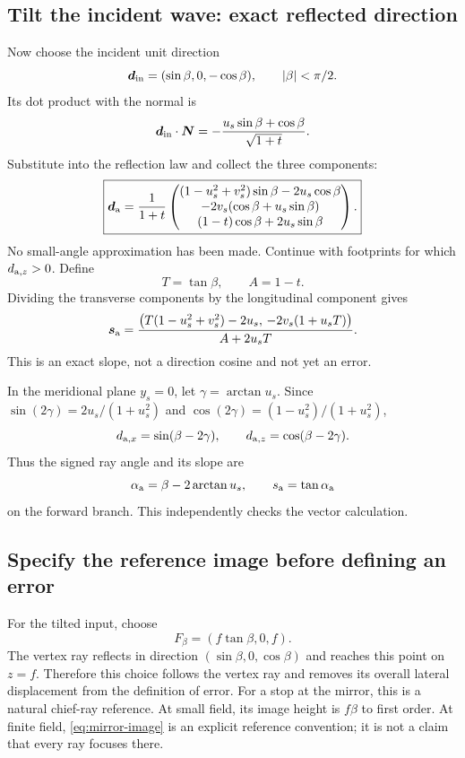 \documentclass[11pt,a4paper]{article}
\numberwithin{equation}{section}
\newcommand{\vct}[1]{\bm{#1}}
\begin{document}
\subsection{Tilt the incident wave: exact reflected direction}
Now choose the incident unit direction
\[
 \vct d_{\rm in}=(\sin\beta,0,-\cos\beta),
 \qquad |\beta|<\pi/2.
\]
Its dot product with the normal is
\[
 \vct d_{\rm in}\cdot\vct N
 =-\frac{u_s\sin\beta+\cos\beta}{\sqrt{1+t}}.
\]
Substitute into the reflection law and collect the three components:
\begin{equation}
 \boxed{
 \vct d_{\rm a}=\frac{1}{1+t}
 \begin{pmatrix}
 (1-u_s^2+v_s^2)\sin\beta-2u_s\cos\beta\\
 -2v_s(\cos\beta+u_s\sin\beta)\\
 (1-t)\cos\beta+2u_s\sin\beta
 \end{pmatrix}.}
 \label{eq:tilted-reflection}
\end{equation}
No small-angle approximation has been made. Continue with footprints
for which $d_{{\rm a},z}>0$. Define
\[
 T=\tan\beta,\qquad A=1-t.
\]
Dividing the transverse components by the longitudinal component gives
\begin{equation}
 \vct s_{\rm a}=
 \frac{\bigl(T(1-u_s^2+v_s^2)-2u_s,\,
             -2v_s(1+u_sT)\bigr)}
      {A+2u_sT}.
 \label{eq:tilted-slope}
\end{equation}
This is an exact slope, not a direction cosine and not yet an error.

In the meridional plane $y_s=0$, let $\gamma=\arctan u_s$. Since
$\sin(2\gamma)=2u_s/(1+u_s^2)$ and
$\cos(2\gamma)=(1-u_s^2)/(1+u_s^2)$,
\[
 d_{{\rm a},x}=\sin(\beta-2\gamma),\qquad
 d_{{\rm a},z}=\cos(\beta-2\gamma).
\]
Thus the signed ray angle and its slope are
\begin{equation}
 \alpha_{\rm a}=\beta-2\arctan u_s,\qquad
 s_{\rm a}=\tan\alpha_{\rm a}
 \label{eq:mirror-angle}
\end{equation}
on the forward branch. This independently checks the vector calculation.

\subsection{Specify the reference image before defining an error}
For the tilted input, choose
\begin{equation}
 F_\beta=(f\tan\beta,0,f).
 \label{eq:mirror-image}
\end{equation}
The vertex ray reflects in direction $(\sin\beta,0,\cos\beta)$ and reaches
this point on $z=f$. Therefore this choice follows the vertex ray and
removes its overall lateral displacement from the definition of error.
For a stop at the mirror, this is a natural chief-ray reference.
At small field, its image height is $f\beta$ to first order.
At finite field, \eqref{eq:mirror-image} is an explicit reference convention;
it is not a claim that every ray focuses there.
\end{document}
